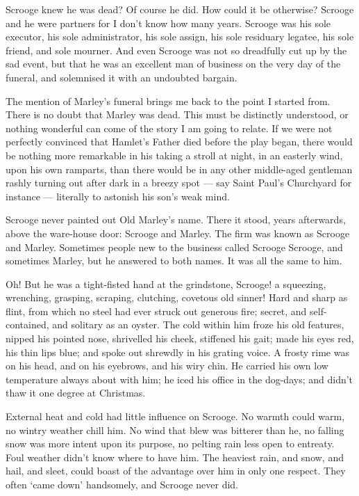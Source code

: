 \documentclass[11pt,twoside]{article}\makeatletter
\begin{document}
Scrooge knew he was dead? Of course he did. How could it be otherwise? Scrooge and he were partners for I don't know how many years. Scrooge was his sole executor, his sole administrator, his sole assign, his sole residuary legatee, his sole friend, and sole mourner. And even Scrooge was not so dreadfully cut up by the sad event, but that he was an excellent man of business on the very day of the funeral, and solemnised it with an undoubted bargain. \par
The mention of Marley's funeral brings me back to the point I started from. There is no doubt that Marley was dead. This must be distinctly understood, or nothing wonderful can come of the story I am going to relate. If we were not perfectly convinced that Hamlet's Father died before the play began, there would be nothing more remarkable in his taking a stroll at night, in an easterly wind, upon his own ramparts, than there  would be in any other middle-aged gentleman rashly turning out after dark in a breezy spot — say Saint Paul's Churchyard for instance — literally to astonish his son's weak mind.\par
Scrooge never painted out Old Marley's name. There it stood, years afterwards, above the ware-house door: Scrooge and Marley. The firm was known as Scrooge and Marley. Sometimes people new to the business called Scrooge Scrooge, and sometimes Marley, but he answered to both names. It was all the same to him. \par
Oh! But he was a tight-fisted hand at the grindstone, Scrooge! a squeezing, wrenching, grasping, scraping, clutching, covetous old sinner! Hard and sharp as flint, from which no steel had ever struck out generous fire; secret, and self-contained, and solitary as an oyster. The cold within him froze his old features, nipped his pointed nose, shrivelled his cheek, stiffened his gait; made his eyes red, his thin lips blue; and spoke out shrewdly in his grating voice. A frosty rime was on his head, and on his eyebrows, and his wiry chin. He  carried his own low temperature always about with him; he iced his office in the dog-days; and didn't thaw it one degree at Christmas.\par
External heat and cold had little influence on Scrooge. No warmth could warm, no wintry weather chill him. No wind that blew was bitterer than he, no falling snow was more intent upon its purpose, no pelting rain less open to entreaty. Foul weather didn't know where to have him. The heaviest rain, and snow, and hail, and sleet, could boast of the advantage over him in only one respect. They often ‘came down’ handsomely, and Scrooge never did.\par
\end{document}

